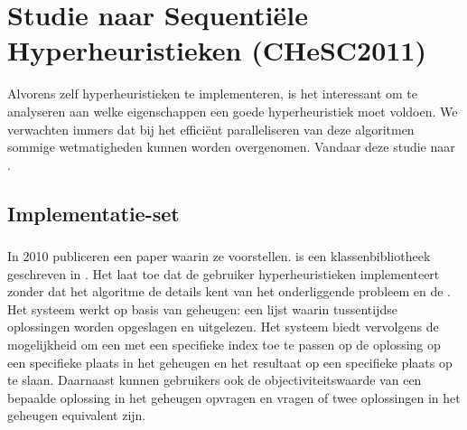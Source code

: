 \chapter{Studie naar Sequenti\"ele Hyperheuristieken (CHeSC2011)}
\label{hoofdstuk:2}

Alvorens zelf hyperheuristieken te implementeren, is het interessant om te analyseren aan welke eigenschappen een goede hyperheuristiek moet voldoen. We verwachten immers dat bij het effici\"ent paralleliseren van deze algoritmen sommige wetmatigheden kunnen worden overgenomen. Vandaar deze studie naar \abseqe{} \abhhn{}.

\section{Implementatie-set}

\subsection{\abhf{}}

In 2010 publiceren  een paper waarin ze \abhf{} voorstellen. \abhf{} is een klassenbibliotheek geschreven in \abjava{}. Het laat toe dat de gebruiker hyperheuristieken implementeert zonder dat het algoritme de details kent van het onderliggende probleem en de \abllhn{}. Het systeem werkt op basis van geheugen: een lijst waarin tussentijdse oplossingen worden opgeslagen en uitgelezen. Het systeem biedt vervolgens de mogelijkheid om een \abllh{} met een specifieke index toe te passen op de oplossing op een specifieke plaats in het geheugen en het resultaat op een specifieke plaats op te slaan. Daarnaast kunnen gebruikers ook de objectiviteitswaarde van een bepaalde oplossing in het geheugen opvragen en vragen of twee oplossingen in het geheugen equivalent zijn.

